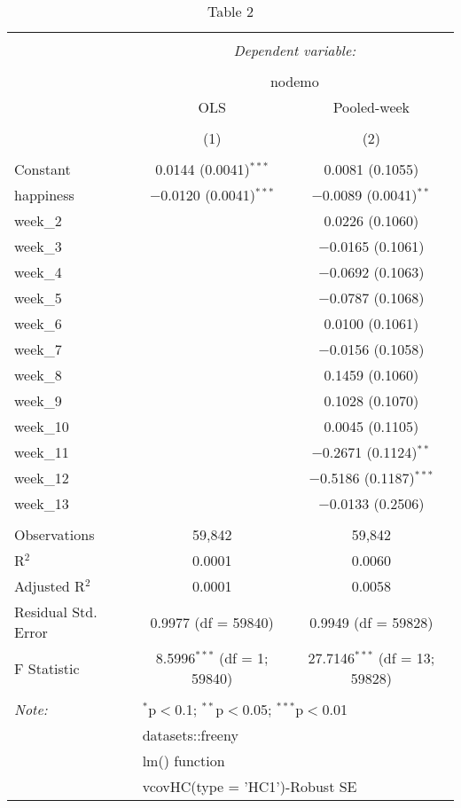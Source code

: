 \documentclass[
]{article}
\begin{document}
\begin{table}[!htbp] \centering 
  \caption{Table 2} 
  \label{} 
\small 
\begin{tabular}{@{\extracolsep{5pt}}lcc} 
\\[-1.8ex]\hline 
\hline \\[-1.8ex] 
 & \multicolumn{2}{c}{\textit{Dependent variable:}} \\ 
\cline{2-3} 
\\[-1.8ex] & \multicolumn{2}{c}{nodemo} \\ 
 & OLS & Pooled-week \\ 
\\[-1.8ex] & (1) & (2)\\ 
\hline \\[-1.8ex] 
 Constant & 0.0144 (0.0041)$^{***}$ & 0.0081 (0.1055) \\ 
  happiness & $-$0.0120 (0.0041)$^{***}$ & $-$0.0089 (0.0041)$^{**}$ \\ 
  week\_2 &  & 0.0226 (0.1060) \\ 
  week\_3 &  & $-$0.0165 (0.1061) \\ 
  week\_4 &  & $-$0.0692 (0.1063) \\ 
  week\_5 &  & $-$0.0787 (0.1068) \\ 
  week\_6 &  & 0.0100 (0.1061) \\ 
  week\_7 &  & $-$0.0156 (0.1058) \\ 
  week\_8 &  & 0.1459 (0.1060) \\ 
  week\_9 &  & 0.1028 (0.1070) \\ 
  week\_10 &  & 0.0045 (0.1105) \\ 
  week\_11 &  & $-$0.2671 (0.1124)$^{**}$ \\ 
  week\_12 &  & $-$0.5186 (0.1187)$^{***}$ \\ 
  week\_13 &  & $-$0.0133 (0.2506) \\ 
 \hline \\[-1.8ex] 
Observations & 59,842 & 59,842 \\ 
R$^{2}$ & 0.0001 & 0.0060 \\ 
Adjusted R$^{2}$ & 0.0001 & 0.0058 \\ 
Residual Std. Error & 0.9977 (df = 59840) & 0.9949 (df = 59828) \\ 
F Statistic & 8.5996$^{***}$ (df = 1; 59840) & 27.7146$^{***}$ (df = 13; 59828) \\ 
\hline 
\hline \\[-1.8ex] 
\textit{Note:}  & \multicolumn{2}{l}{$^{*}$p$<$0.1; $^{**}$p$<$0.05; $^{***}$p$<$0.01} \\ 
 & \multicolumn{2}{l}{datasets::freeny} \\ 
 & \multicolumn{2}{l}{lm() function} \\ 
 & \multicolumn{2}{l}{vcovHC(type = 'HC1')-Robust SE} \\ 
\end{tabular} 
\end{table}
\end{document}
